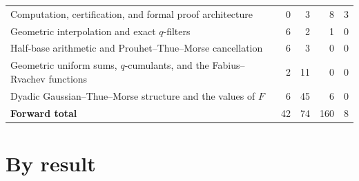 \documentclass[11pt,a4paper,oneside,openany]{book}
\theoremstyle{definition}
\theoremstyle{remark}
\begin{document}
\begin{center}
\begin{tabular}{@{}p{}rrrr@{}}
Computation, certification, and formal proof architecture & 0 & 3 & 8 & 3\\
Geometric interpolation and exact $q$-filters & 6 & 2 & 1 & 0\\
Half-base arithmetic and Prouhet--Thue--Morse cancellation & 6 & 3 & 0 & 0\\
Geometric uniform sums, $q$-cumulants, and the Fabius--Rvachev functions & 2 & 11 & 0 & 0\\
Dyadic Gaussian--Thue--Morse structure and the values of $F$ & 6 & 45 & 6 & 0\\
\midrule
\textbf{Forward total} & 42 & 74 & 160 & 8\\
\bottomrule
\end{tabular}
\end{center}

\section{By result}
\end{document}
